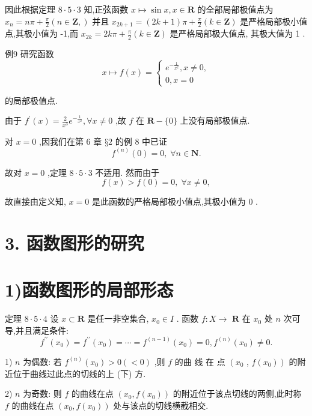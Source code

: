 因此根据定理 $8 \cdot  5 \cdot  3$ 知,正弦函数 $x \mapsto  \sin x,x \in  \mathbf{R}$ 的全部局部极值点为 ${x}_{n} = {n\pi } + \frac{\pi }{2}\left( {n \in  \mathbf{Z},}\right)$ 并且 ${x}_{{2k} + 1} = \left( {{2k} + 1}\right) \pi  + \frac{\pi }{2}\left( {k \in  \mathbf{Z}}\right)$ 是严格局部极小值点,其极小值为 -1,而 ${x}_{2k} = {2k\pi } + \frac{\pi }{2}\left( {k \in  \mathbf{Z}}\right)$ 是严格局部极大值点, 其极大值为 1 .

例9 研究函数
$$x \mapsto  f\left( x\right)  = \left\{  \begin{array}{l} {e}^{-\frac{1}{{x}^{2}}},x \neq  0, \\  0,x = 0 \end{array}\right.$$

的局部极值点.

由于 ${f}^{\prime }\left( x\right)  = \frac{2}{{x}^{3}}{e}^{-\frac{1}{{x}^{2}}},\forall x \neq  0$ ,故 $f$ 在 $\mathbf{R} - \{ 0\}$ 上没有局部极值点.

对 $x = 0$ ,因我们在第 6 章 $§2$ 的例 8 中已证
$${f}^{\left( n\right) }\left( 0\right)  = 0,\;\forall n \in  \mathbf{N}.$$

故对 $x = 0$ ,定理 $8 \cdot  5 \cdot  3$ 不适用. 然而由于
$$f\left( x\right)  > f\left( 0\right)  = 0,\;\forall x \neq  0,$$

故直接由定义知, $x = 0$ 是此函数的严格局部极小值点,其极小值为 0 .

\section*{3. 函数图形的研究}

\section*{1)函数图形的局部形态}

定理 $8 \cdot  5 \cdot  4$ 设 $x \subset  \mathbf{R}$ 是任一非空集合, ${x}_{0} \in  I$ . 函数 $f : X \rightarrow$  $\mathbf{R}$ 在 ${x}_{0}$ 处 $n$ 次可导,并且满足条件:
$${f}^{\prime \prime }\left( {x}_{0}\right)  = {f}^{\prime \prime }\left( {x}_{0}\right)  = \cdots  = {f}^{\left( n - 1\right) }\left( {x}_{0}\right)  = 0,{f}^{\left( n\right) }\left( {x}_{0}\right)  \neq  0.$$

1) $n$ 为偶数: 若 ${f}^{\left( n\right) }\left( {x}_{0}\right)  > 0\left( { < 0}\right)$ ,则 $f$ 的曲 线 在 点 $\left( {x}_{0}\right.$ , $\left. {f\left( {x}_{0}\right) }\right)$ 的附近位于曲线过此点的切线的上 (下) 方.

2) $n$ 为奇数: 则 $f$ 的曲线在点 $\left( {{x}_{0},f\left( {x}_{0}\right) }\right)$ 的附近位于该点切线的两侧,此时称 $f$ 的曲线在点 $\left( {{x}_{0},f\left( {x}_{0}\right) }\right)$ 处与该点的切线横截相交.

